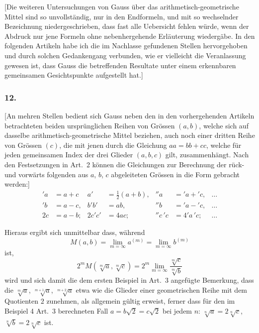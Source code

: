 \documentclass[12pt,a4paper]{article}
\begin{document}

[Die weiteren Untersuchungen von Gauss \"uber das arithmetisch-geometrische Mittel sind so unvollst\"andig, nur in den Endformeln, und mit so wechselnder Bezeichnung niedergeschrieben, dass fast alle Uebersicht fehlen w\"urde, wenn der Abdruck nur jene Formeln ohne nebenhergehende Erl\"auterung wiederg\"abe. In den folgenden Artikeln habe ich die im Nachlasse gefundenen Stellen hervorgehoben und durch solchen Gedankengang verbunden, wie er vielleicht die Veranlassung gewesen ist, dass Gauss die betreffenden Resultate unter einem erkennbaren gemeinsamen Gesichtspunkte aufgestellt hat.]

\subsubsection*{12.}

[An mehren Stellen bedient sich Gauss neben den in den vorhergehenden Artikeln betrachteten beiden urspr\"unglichen Reihen von Gr\"ossen $(a,b)$, welche sich auf dasselbe arithmetisch-geometrische Mittel beziehen, auch noch einer dritten Reihe von Gr\"ossen $(c)$, die mit jenen durch die Gleichung $aa = bb + cc$, welche f\"ur jeden gemeinsamen Index der drei Glieder $(a,b,c)$ gilt, zusammenh\"angt. Nach den Festsetzungen in Art.\ 2 k\"onnen die Gleichungen zur Berechnung der r\"uck- und vorw\"arts folgenden aus $a$, $b$, $c$ abgeleiteten Gr\"ossen in die Form gebracht werden:]
\[
\begin{aligned}
'a &= a+c & a' &= \tfrac{1}{2}(a+b), & ''a &= {'a} + {'c}, & \dots \\
'b &= a-c, & b'b' &= ab, & ''b &= {'a} - {'c}, & \dots \\
2c &= a-b; & 2c'c' &= 4ac; & ''c\,{'c} &= 4{'a}\,{'c}; & \dots
\end{aligned}
\]

Hieraus ergibt sich unmittelbar dass, w\"ahrend
\[
M(a,b) = \lim_{m=\infty} a^{(m)} = \lim_{m=\infty} b^{(m)}
\]
ist,
\[
2^m M(\sqrt[m]{a}, \sqrt[m]{c}) = 2^m \lim_{m=\infty} \frac{\sqrt[m]{c}}{\sqrt[m]{b}}
\]
wird und sich damit die dem ersten Beispiel in Art.\ 3 angef\"ugte Bemerkung, dass die $\sqrt[m]{a}$, $\sqrt[m+1]{a}$, $\sqrt[m+2]{a}$ etwa wie die Glieder einer geometrischen Reihe mit dem Quotienten $2$ zunehmen, als allgemein g\"ultig erweist, ferner dass f\"ur den im Beispiel 4 Art.\ 3 berechneten Fall $a=b\sqrt{2}=c\sqrt{2}$ bei jedem $n$: $\sqrt[n]{a} = 2\sqrt[n]{c}$, $\sqrt[n]{b} = 2\sqrt[n]{c}$ ist.
\end{document}
